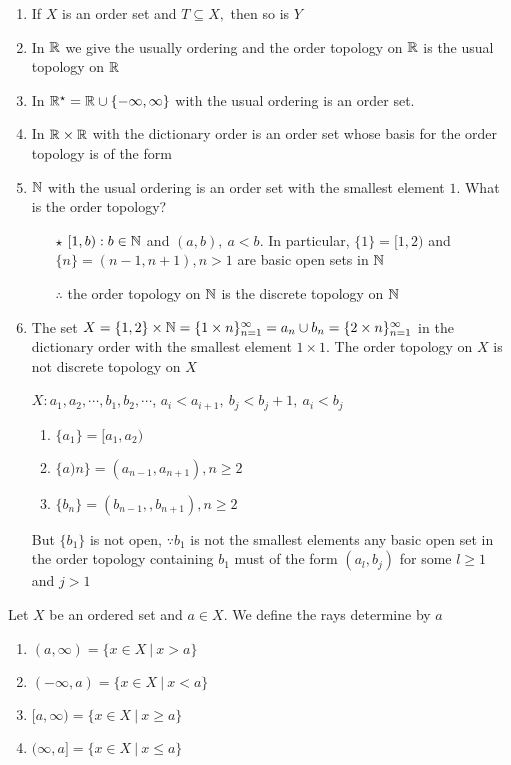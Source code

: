 \begin{enumerate}
	\item If $X$ is an order set and $T \subseteq X,$ then so is $Y$
	\item In $\mathbb{R}$ we give the usually ordering and the order topology on $\mathbb{R}$ is the usual topology on $\mathbb{R}$
	\item In $\mathbb{R}^{\star} = \mathbb{R} \cup \{-\infty , \infty\}$ with the usual ordering is an order set.
	\item In $\mathbb{R} \times \mathbb{R}$ with the dictionary order is an order set whose basis for the order topology is of the form
	\item $\mathbb{N}$ with the usual ordering is an order set with the smallest element $1$. What is the order topology?
		\begin{enumerate}
		\item[$\star$] $[1,b):b\in \mathbb{N}$ and $(a,b),~a<b$. In particular, $\{1\} = [1,2)$ and $\{n\} = (n-1,n+1),n>1$ are basic open sets in $\mathbb{N}$
		
		$\therefore$ the order topology on $\mathbb{N}$ is the discrete topology on $\mathbb{N}$
		\end{enumerate}
	\item The set $X = \{1,2\} \times \mathbb{N} = \{1 \times n\}^{\infty}_{n = 1} = a_n  \cup  b_n = \{2 \times n \}^{\infty}_{n = 1}$ in the dictionary order with the smallest element $1 \times 1$. The order topology on $X$ is not discrete topology on $X$
	
	$X:a_1,a_2,\cdots,b_1,b_2,\cdots$, $a_i < a_{i+1},~b_j < b_j + 1,~a_i < b_j$
	\begin{enumerate}[label = $\star$]
		\item $\{a_1\} = [a_1,a_2)$
		\item $\{a)n\} = (a_{n-1},a_{n+1}),n \geq 2$
		\item $\{b_n\} = (b_{n-1},,b_{n+1}),n\geq 2$
	\end{enumerate}
	But $\{b_1\}$ is not open, $\because b_1$ is not the smallest elements any basic open set in the order topology containing $b_1$ must of the form $(a_l,b_j)$ for some $l \geq 1$ and $j > 1$
\end{enumerate}


\begin{defn}
	Let $X$ be an ordered set and $a \in X$. We define the rays determine by $a$
	
	\begin{enumerate}[label = $\star$]
		\item $(a,\infty) = \{x \in X ~|~ x > a\}$
		\item $(-\infty,a) = \{x \in X ~|~ x < a\}$
		\item $[a,\infty) = \{x \in X ~|~ x \geq a\}$
		\item $(\infty,a] = \{x \in X ~|~ x \leq a\}$
	\end{enumerate}
\end{defn}

